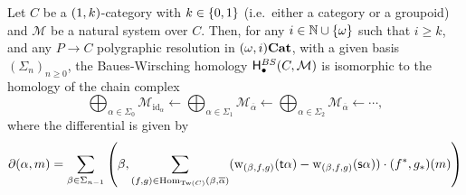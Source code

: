 \documentclass{amsart}
\newcommand{\M}{\mathcal{M}}
\newcommand{\Tw}[1]{\mathrm{Tw}(#1)}
\newcommand{\id}{\mathrm{id}}
\newcommand{\src}[1]{\source{} #1}
\newcommand{\tgt}[1]{\target{} #1}
\renewcommand{\homset}[3]{\mathrm{Hom}_{#1}(#2,#3)}
\newcommand{\wght}[1]{\mathrm{w}_{#1}}
\begin{document}
  \begin{theorem}\label{polhom}
    Let $C$ be a $(1,k)$\nbd-category with $k \in \left\{0,1\right\}$
    (i.e.\ either a category or a groupoid) and $\M$ be a natural
    system over $C$. Then, for any $i\in
    \mathbb N\cup\left\{\omega\right\}$ such that $i\geq k$, and any $P \to C$ 
    polygraphic resolution in $(\omega,i)\mathbf{Cat}$, with a given basis
    $(\Sigma_n)_{n\geq 0}$, the Baues-Wirsching
    homology $\Ho^{BS}_{\bullet}(C,\M)$ is isomorphic to the homology
    of the chain complex
\[         \bigoplus_{\alpha \in \Sigma_0}\M_{\id_\alpha}\leftarrow \bigoplus_{\alpha \in
        \Sigma_1}\M_{\overline{\alpha}} \leftarrow \bigoplus_{\alpha \in
        \Sigma_2}\M_{\overline{\alpha}} \leftarrow \cdots,
    \]
    where the differential is given by
    \[
      \partial(\alpha,m)=\sum_{\beta \in
        \Sigma_{n-1}}\left(\beta,\sum_{(f,g)\in
        \homset{\Tw{C}}{\beta}{\overline{\alpha}}}(\wght{(\beta,f,g)}(\tgt{\alpha})-\wght{(\beta,f,g)}(\src{\alpha}))\cdot
      (f^*,g_*)(m)\right)
  \]
  \end{theorem}

\end{document}
